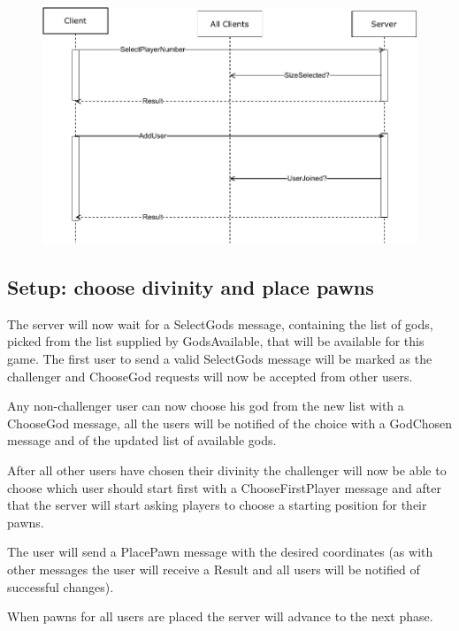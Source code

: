 \documentclass{article}
\begin{document}
\begin{figure}[H]
    \centering
    \includegraphics[width=0.85\linewidth]{communication_uml_1.pdf}
\end{figure}

\subsection*{Setup: choose divinity and place pawns}

The server will now wait for a SelectGods message, containing the list of gods, picked from the list supplied by GodsAvailable, that will be available for this game. The first user to send a valid SelectGods message will be marked as the challenger and ChooseGod requests will now be accepted from other users.

Any non-challenger user can now choose his god from the new list with a ChooseGod message, all the users will be notified of the choice with a GodChosen message and of the updated list of available gods.

After all other users have chosen their divinity the challenger will now be able to choose which user should start first with a ChooseFirstPlayer message and after that the server will start asking players to choose a starting position for their pawns.

The user will send a PlacePawn message with the desired coordinates (as with other messages the user will receive a Result and all users will be notified of successful changes).

When pawns for all users are placed the server will advance to the next phase.
\end{document}

